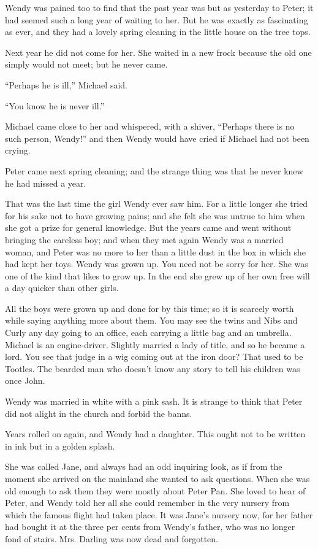 Wendy was pained too to find that the past year was but as yesterday to
Peter; it had seemed such a long year of waiting to her. But he was
exactly as fascinating as ever, and they had a lovely spring cleaning
in the little house on the tree tops.

Next year he did not come for her. She waited in a new frock because
the old one simply would not meet; but he never came.

``Perhaps he is ill,'' Michael said.

``You know he is never ill.''

Michael came close to her and whispered, with a shiver, ``Perhaps there
is no such person, Wendy!'' and then Wendy would have cried if Michael
had not been crying.

Peter came next spring cleaning; and the strange thing was that he
never knew he had missed a year.

That was the last time the girl Wendy ever saw him. For a little longer
she tried for his sake not to have growing pains; and she felt she was
untrue to him when she got a prize for general knowledge. But the years
came and went without bringing the careless boy; and when they met
again Wendy was a married woman, and Peter was no more to her than a
little dust in the box in which she had kept her toys. Wendy was grown
up. You need not be sorry for her. She was one of the kind that likes
to grow up. In the end she grew up of her own free will a day quicker
than other girls.

All the boys were grown up and done for by this time; so it is scarcely
worth while saying anything more about them. You may see the twins and
Nibs and Curly any day going to an office, each carrying a little bag
and an umbrella. Michael is an engine-driver. Slightly married a lady
of title, and so he became a lord. You see that judge in a wig coming
out at the iron door? That used to be Tootles. The bearded man who
doesn't know any story to tell his children was once John.

Wendy was married in white with a pink sash. It is strange to think
that Peter did not alight in the church and forbid the banns.

Years rolled on again, and Wendy had a daughter. This ought not to be
written in ink but in a golden splash.

She was called Jane, and always had an odd inquiring look, as if from
the moment she arrived on the mainland she wanted to ask questions.
When she was old enough to ask them they were mostly about Peter Pan.
She loved to hear of Peter, and Wendy told her all she could remember
in the very nursery from which the famous flight had taken place. It
was Jane's nursery now, for her father had bought it at the three per
cents from Wendy's father, who was no longer fond of stairs. Mrs.
Darling was now dead and forgotten.

